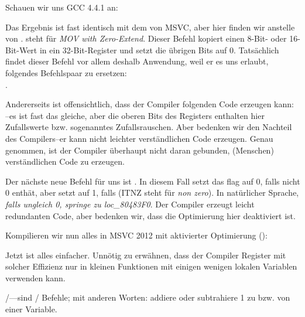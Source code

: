 
Schauen wir uns GCC 4.4.1 an:



\label{movzx}

Das Ergebnis ist fast identisch mit dem von MSVC, aber hier finden wir \MOVZX
anstelle von \MOVSX. 
\MOVZX steht für \emph{MOV with Zero-Extend}. 
Dieser Befehl kopiert einen 8-Bit- oder 16-Bit-Wert in ein 32-Bit-Register und
setzt die übrigen Bits auf 0.
Tatsächlich findet dieser Befehl vor allem deshalb Anwendung, weil er es uns
erlaubt, folgendes Befehlspaar zu ersetzen:\\
.

Andererseits ist offensichtlich, dass der Compiler folgenden Code erzeugen kann:
\\
--es ist fast das gleiche, aber die
oberen Bits des \EAX Registers enthalten hier Zufallswerte bzw.
sogenanntes Zufallsrauschen.
Aber bedenken wir den Nachteil des Compilers--er kann nicht leichter
verständlichen Code erzeugen. 
Genau genommen, ist der Compiler überhaupt nicht daran gebunden, (Menschen)
verständlichen Code zu erzeugen.


Der nächste neue Befehl für uns ist \SETNZ.
In diesem Fall setzt  das \ZF flag auf 0, falls \AL nicht 0
enthät, aber \SETNZ setzt \AL auf 1, falls  (IT{NZ} steht für
\emph{non zero}).
In natürlicher Sprache, \emph{falls \AL ungleich 0, springe zu loc\_80483F0}. 
Der Compiler erzeugt leicht redundanten Code, aber bedenken wir, dass die
Optimierung hier deaktiviert ist.

\label{strlen_MSVC_Ox}

Kompilieren wir nun alles in MSVC 2012 mit aktivierter Optimierung (\Ox):



Jetzt ist alles einfacher.
Unnötig zu erwähnen, dass der Compiler Register mit solcher Effizienz nur in
kleinen Funktionen mit einigen wenigen lokalen Variablen verwenden kann.

\INC/\DEC---sind / Befehle; mit anderen Worten:
addiere oder subtrahiere 1 zu bzw. von einer Variable. 

